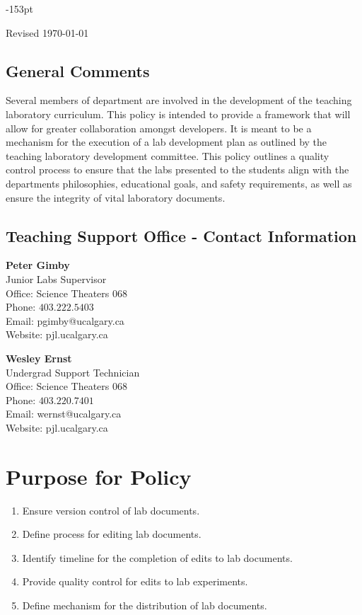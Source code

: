 \begin{adjustwidth}{}{-153pt}
\nointerlineskip\leavevmode

\vspace{-1cm}

\noindent Revised \today

\subsection{\bf General Comments}
Several members of department are involved in the development of the teaching laboratory curriculum. This policy is intended to provide a framework that will allow for greater collaboration amongst developers. It is meant to be a mechanism for the execution of a lab development plan as outlined by the teaching laboratory development committee. This policy outlines a quality control process to ensure that the labs presented to the students align with the departments philosophies, educational goals, and safety requirements, as well as ensure the integrity of vital laboratory documents. 


\subsection{\bf Teaching Support Office - Contact Information}
\begin{minipage}{0.5\textwidth}
{\bf Peter Gimby}\\
Junior Labs Supervisor\\
Office: Science Theaters $068$\\
Phone: $403.222.5403$\\
Email: pgimby@ucalgary.ca\\
Website: pjl.ucalgary.ca\\
\end{minipage}
\begin{minipage}{0.5\textwidth}
{\bf Wesley Ernst}\\
Undergrad Support Technician\\
Office: Science Theaters $068$\\
Phone: $403.220.7401$\\
Email: wernst@ucalgary.ca\\
Website: pjl.ucalgary.ca\\
\end{minipage}

\section{\bf Purpose for Policy}
\begin{enumerate}[noitemsep]
\item Ensure version control of lab documents.
\item Define process for editing lab documents.
\item Identify timeline for the completion of edits to lab documents.
\item Provide quality control for edits to lab experiments.
\item Define mechanism for the distribution of lab documents.
\end{enumerate}


\end{adjustwidth}
